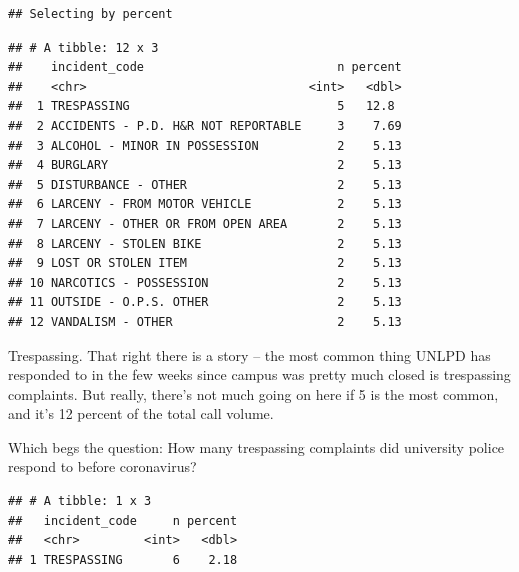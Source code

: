 \documentclass[]{book}
\newenvironment{Shaded}{\begin{snugshade}}{\end{snugshade}}
\newcommand{\DataTypeTok}[1]{\textcolor[rgb]{0.13,0.29,0.53}{#1}}
\newcommand{\DecValTok}[1]{\textcolor[rgb]{0.00,0.00,0.81}{#1}}
\newcommand{\KeywordTok}[1]{\textcolor[rgb]{0.13,0.29,0.53}{\textbf{#1}}}
\newcommand{\NormalTok}[1]{#1}
\newcommand{\OperatorTok}[1]{\textcolor[rgb]{0.81,0.36,0.00}{\textbf{#1}}}
\newcommand{\OtherTok}[1]{\textcolor[rgb]{0.56,0.35,0.01}{#1}}
\newcommand{\StringTok}[1]{\textcolor[rgb]{0.31,0.60,0.02}{#1}}
\begin{document}
\begin{verbatim}
## Selecting by percent
\end{verbatim}

\begin{verbatim}
## # A tibble: 12 x 3
##    incident_code                           n percent
##    <chr>                               <int>   <dbl>
##  1 TRESPASSING                             5   12.8 
##  2 ACCIDENTS - P.D. H&R NOT REPORTABLE     3    7.69
##  3 ALCOHOL - MINOR IN POSSESSION           2    5.13
##  4 BURGLARY                                2    5.13
##  5 DISTURBANCE - OTHER                     2    5.13
##  6 LARCENY - FROM MOTOR VEHICLE            2    5.13
##  7 LARCENY - OTHER OR FROM OPEN AREA       2    5.13
##  8 LARCENY - STOLEN BIKE                   2    5.13
##  9 LOST OR STOLEN ITEM                     2    5.13
## 10 NARCOTICS - POSSESSION                  2    5.13
## 11 OUTSIDE - O.P.S. OTHER                  2    5.13
## 12 VANDALISM - OTHER                       2    5.13
\end{verbatim}

Trespassing. That right there is a story -- the most common thing UNLPD has responded to in the few weeks since campus was pretty much closed is trespassing complaints. But really, there's not much going on here if 5 is the most common, and it's 12 percent of the total call volume.

Which begs the question: How many trespassing complaints did university police respond to before coronavirus?

\begin{Shaded}
\end{Shaded}

\begin{verbatim}
## # A tibble: 1 x 3
##   incident_code     n percent
##   <chr>         <int>   <dbl>
## 1 TRESPASSING       6    2.18
\end{verbatim}
\end{document}
